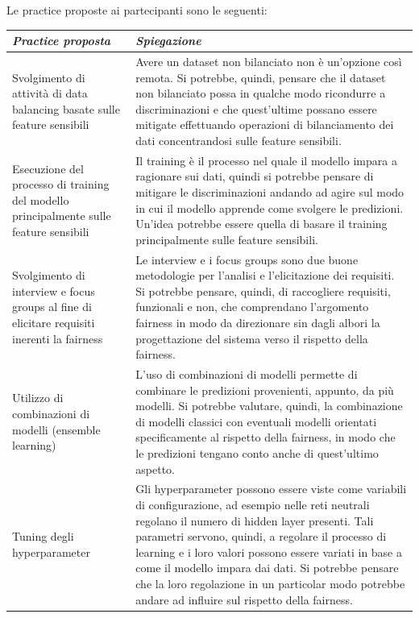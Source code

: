 Le practice proposte ai partecipanti sono le seguenti:
\begin{longtable}{| p{} | p{} |}
  \hline\textbf{\textit{Practice proposta}} & \textbf{\textit{Spiegazione}}
    \\ \hline
    \rowcolor{Gray!30}
    Svolgimento di attività di data balancing basate sulle feature sensibili
    &
    Avere un dataset non bilanciato non è un'opzione così remota. Si potrebbe, quindi, pensare che il dataset non bilanciato possa in qualche modo ricondurre a discriminazioni e che quest'ultime possano essere mitigate effettuando operazioni di bilanciamento dei dati concentrandosi sulle feature sensibili.
    \\ \hline
    Esecuzione del processo di training del modello principalmente sulle feature sensibili
    &
    Il training è il processo nel quale il modello impara a ragionare sui dati, quindi si potrebbe pensare di mitigare le discriminazioni andando ad agire sul modo in cui il modello apprende come svolgere le predizioni. Un'idea potrebbe essere quella di basare il training principalmente sulle feature sensibili.
    \\ \hline
    \rowcolor{Gray!30}
    Svolgimento di interview e focus groups al fine di elicitare requisiti inerenti la fairness
    &
    Le interview e i focus groups sono due buone metodologie per l'analisi e l'elicitazione dei requisiti. Si potrebbe pensare, quindi, di raccogliere requisiti, funzionali e non, che comprendano l'argomento fairness in modo da direzionare sin dagli albori la progettazione del sistema verso il rispetto della fairness.
     \\ \hline
    Utilizzo di combinazioni di modelli (ensemble learning)
    &
    L'uso di combinazioni di modelli permette di combinare le predizioni provenienti, appunto, da più modelli. Si potrebbe valutare, quindi, la combinazione di modelli classici con eventuali modelli orientati specificamente al rispetto della fairness, in modo che le predizioni tengano conto anche di quest'ultimo aspetto.
    \\ \hline
    \rowcolor{Gray!30}
    Tuning degli hyperparameter
    &
    Gli hyperparameter possono essere viste come variabili di configurazione, ad esempio nelle reti neutrali regolano il numero di hidden layer presenti. Tali parametri servono, quindi, a regolare il processo di learning e i loro valori possono essere variati in base a come il modello impara dai dati. Si potrebbe pensare che la loro regolazione in un particolar modo potrebbe andare ad influire sul rispetto della fairness.

\end{longtable}
